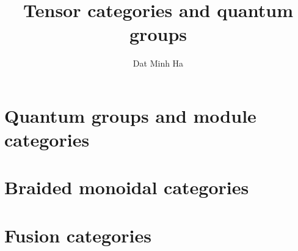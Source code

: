 

\setcounter{section}{-1}





	\title{Tensor categories and quantum groups}
	
	\author{Dat Minh Ha}
	\maketitle
	
	\begin{abstract}
	    
	\end{abstract}
	
	{
      \hypersetup{} 
      \dominitoc
      \tableofcontents %
    }
    
    \chapter{Quantum groups and module categories}
        \begin{abstract}
            
        \end{abstract}
        
        \minitoc
        
        
        
        
    
    \chapter{Braided monoidal categories}
        \begin{abstract}
            
        \end{abstract}
        
        \minitoc
    
    \chapter{Fusion categories}
        \begin{abstract}
            
        \end{abstract}
        
        \minitoc
        
